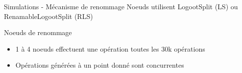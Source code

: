   \begin{frame}{Simulations - Mécanisme de renommage}
    Noeuds \alert{utilisent LogootSplit} (LS) ou \alert{RenamableLogootSplit} (RLS)
    \begin{block}{Noeuds de renommage}
      \begin{itemize}
        \item 1 à 4 noeuds effectuent une \alert{opération \ren toutes les 30k opérations}
        \item Opérations \ren générées à un point donné sont \alert{concurrentes}
      \end{itemize}
    \end{block}
  \end{frame}

